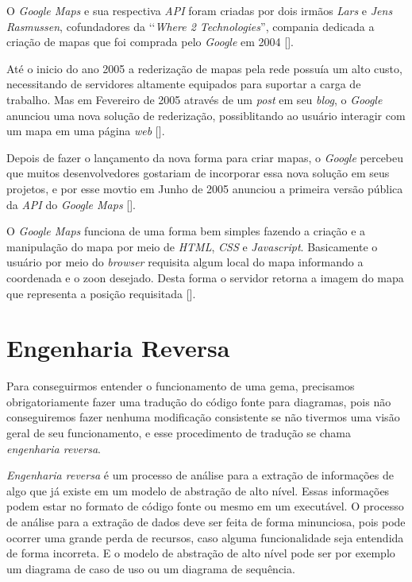 O \emph{Google Maps} e sua respectiva \emph{API} foram criadas por dois irmãos \emph{Lars} e 
\emph{Jens Rasmussen}, cofundadores da ‘‘\emph{Where 2 Technologies}'', compania dedicada a criação de mapas
que foi comprada pelo \emph{Google} em 2004 [].

Até o inicio do ano 2005 a rederização de mapas pela rede possuía um alto custo, necessitando de 
servidores altamente equipados para suportar a carga de trabalho. Mas em Fevereiro de 2005 através 
de um \emph{post} em seu \emph{blog}, o \emph{Google} anunciou uma nova solução de rederização, 
possiblitando ao usuário interagir com um mapa em uma página \emph{web}
[].

Depois de fazer o lançamento da nova forma para criar mapas, o \emph{Google} percebeu que 
muitos desenvolvedores gostariam de incorporar essa nova solução em seus projetos, e por esse 
movtio em Junho de 2005 anunciou a primeira versão pública da \emph{API} do \emph{Google Maps}
[].

O \emph{Google Maps} funciona de uma forma bem simples fazendo a criação e a manipulação do mapa
por meio de \emph{HTML}, \emph{CSS} e \emph{Javascript}. Basicamente o usuário por meio do \emph{browser}
requisita algum local do mapa informando a coordenada e o zoon desejado. Desta forma o servidor retorna a 
imagem do mapa que representa a posição requisitada []. 

\section{Engenharia Reversa}
\label{section:engenharia_reversa}

Para conseguirmos entender o funcionamento de uma gema, precisamos obrigatoriamente fazer uma tradução
do código fonte para diagramas, pois não conseguiremos fazer nenhuma modificação consistente
se não tivermos uma visão geral de seu funcionamento, e esse procedimento de tradução se chama 
\emph{engenharia reversa}.

\emph{Engenharia reversa} é um processo de análise para a extração de informações de algo que já 
existe em um modelo de abstração de alto nível. Essas informações podem estar no formato de código 
fonte ou mesmo em um executável. O processo de análise para a extração de dados deve ser feita de forma
minunciosa, pois pode ocorrer uma grande perda de recursos, caso alguma funcionalidade seja entendida de
forma incorreta. E o modelo de abstração de alto nível pode ser por exemplo um diagrama de caso de uso ou
um diagrama de sequência.


